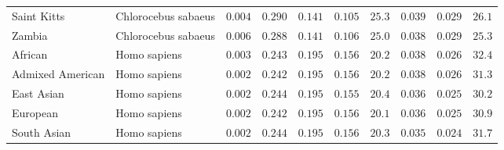 \documentclass{article}
\begin{document}
\begin{center}
\begin{longtable}{|l|l|r|r|r|r|r|r|r|r|}
            Saint Kitts          & Chlorocebus sabaeus & $ 0.004$              & $ 0.290$                      & $ 0.141$ & $ 0.105$     & $  25.3$      & $ 0.039$ & $ 0.029$ & $  26.1$ \\
            Zambia               & Chlorocebus sabaeus & $ 0.006$              & $ 0.288$                      & $ 0.141$ & $ 0.106$     & $  25.0$      & $ 0.038$ & $ 0.029$ & $  25.3$ \\
            African              & Homo sapiens        & $ 0.003$              & $ 0.243$                      & $ 0.195$ & $ 0.156$     & $  20.2$      & $ 0.038$ & $ 0.026$ & $  32.4$ \\
            Admixed American     & Homo sapiens        & $ 0.002$              & $ 0.242$                      & $ 0.195$ & $ 0.156$     & $  20.2$      & $ 0.038$ & $ 0.026$ & $  31.3$ \\
            East Asian           & Homo sapiens        & $ 0.002$              & $ 0.244$                      & $ 0.195$ & $ 0.155$     & $  20.4$      & $ 0.036$ & $ 0.025$ & $  30.2$ \\
            European             & Homo sapiens        & $ 0.002$              & $ 0.242$                      & $ 0.195$ & $ 0.156$     & $  20.1$      & $ 0.036$ & $ 0.025$ & $  30.9$ \\
            South Asian          & Homo sapiens        & $ 0.002$              & $ 0.244$                      & $ 0.195$ & $ 0.156$     & $  20.3$      & $ 0.035$ & $ 0.024$ & $  31.7$ \\
        \end{longtable}

    \end{center}
\end{document}
